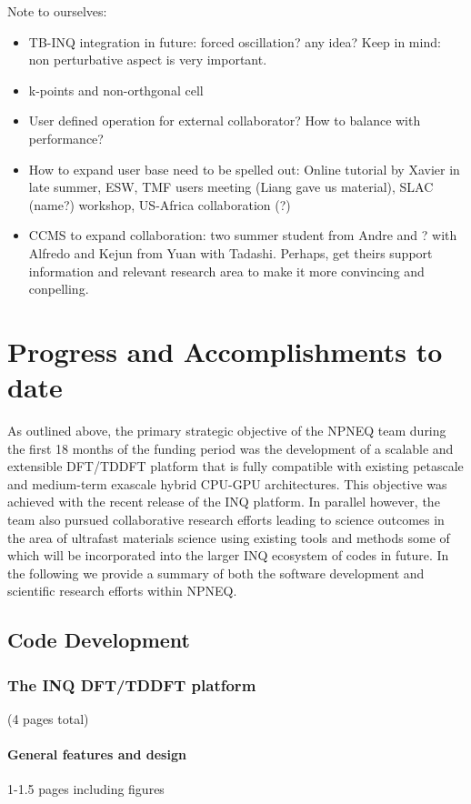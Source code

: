 {\color{green}
Note to ourselves:
\begin{itemize}
    \item TB-INQ integration in future: forced oscillation? any idea? Keep in mind: non perturbative aspect is very important.
    \item k-points and non-orthgonal cell
    \item User defined operation for external collaborator? How to balance with performance?
    \item How to expand user base need to be spelled out: Online tutorial by Xavier in late summer, ESW, TMF users meeting (Liang gave us material), SLAC (name?) workshop, US-Africa collaboration (?)
    \item CCMS to expand collaboration: two summer student from Andre and ? with Alfredo and Kejun from Yuan with Tadashi. Perhaps, get theirs support information and relevant research area to make it more convincing and conpelling.
\end{itemize}

}
\clearpage

\section{Progress and Accomplishments to date} 
As outlined above, the primary strategic objective of the NPNEQ team during the first 18 months of the funding period was the development of a scalable and extensible DFT/TDDFT platform that is fully compatible with existing petascale and medium-term exascale hybrid CPU-GPU architectures. This objective was achieved with the recent release of the INQ platform. In parallel however, the team also pursued collaborative research efforts leading to science outcomes in the area of ultrafast materials science using existing tools and methods some of which will be incorporated into the larger INQ ecosystem of codes in future. In the following we provide a summary of both the software development and scientific research efforts within NPNEQ.   
\subsection{Code Development}
\subsubsection{The INQ DFT/TDDFT platform} (4 pages total)
\paragraph{General features and design}
1-1.5 pages including figures
